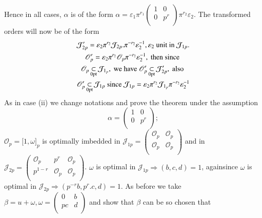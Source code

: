 Hence in all cases, $ \alpha $ is of the form $ \alpha =
\varepsilon_1 \pi^{r_1} \begin{pmatrix} 1 &  0 \\ 0 & p^r
  \\ \end{pmatrix} \pi^{r_2} \varepsilon_2 $. The transformed orders
will now be of the form 
\begin{gather*}
  \mathcal{J}'_{2p} = \varepsilon_2 \pi^{r_2}
  \mathcal{J}_{2p}. \pi^{-r_2} \varepsilon^{-1}_{2}, \varepsilon_2
  \text{ unit in } \mathcal{J}_{1p}. \\ 
  \mathscr{O}'_p = \varepsilon_2 \pi^{r_2} \mathscr{O}_p \pi^{-r_2}
  \varepsilon^{-1}_{2}, \text{ then since } \\ 
  \mathscr{O}_p \subs_{\0pt}  \mathcal{J}_{1_p},  \text{ we have }
  \mathscr{O}'_p \subs_{\0pt} \mathcal{J}'_{2p}, \text{ also } \\    
  \mathscr{O}'_p \subs_{\0pt}  \mathcal{J}_{1p} \text{ since }
  \mathcal{J}_{1p} = \varepsilon_2 \pi^{r_2} \mathcal{J}_{1_p}
  \pi^{-r_2} \varepsilon^{-1}_2  
\end{gather*}
As in case (ii)  we change notations and prove the theorem under
the assumption 
$$
\alpha = \begin{pmatrix} 1 &  0 \\ 0 & p^r \\ \end{pmatrix} ;
$$
 $ \mathscr{O}_p = \big[ 1, \omega \big ] _p $ is optimally imbedded in
$ \mathcal{J}_{1p} = \begin{pmatrix} \mathscr{O}_p &  \mathscr{O}_p
  \\ \mathscr{O}_p & \mathscr{O}_p \\ \end{pmatrix} $ and  in  $
\mathcal{J}_{2p} = \begin{pmatrix} \mathscr{O}_p &  p^r &
  \mathscr{O}_p \\ p^{1-r}  & \mathscr{O}_p & \mathscr{O}_p
  \\ \end{pmatrix} $. $ \omega $ is optimal in $ \mathcal{J}_{1p}
\Rightarrow ( b,c,d ) = 1 $, again\pageoriginale since $\omega $ is optimal in $
\mathcal{J}_{2p} \Rightarrow ( p^{-r}b, p^r.c, d ) =  1 $. As before
we take $ \beta = u + \omega, \omega = \begin{pmatrix} 0 &  b \\ pc &
  d \\ \end{pmatrix} $ and show that  $ \beta $ can be so chosen that
